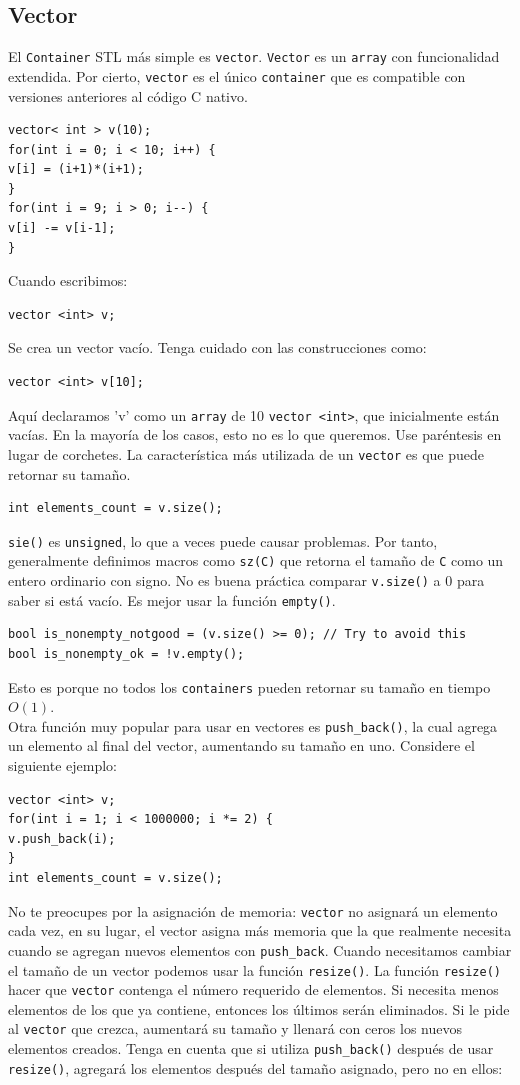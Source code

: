 \documentclass[a4paper,12pt]{article}
\begin{document}
\subsection*{Vector}
El \texttt{Container} STL más simple es \texttt{vector}. \texttt{Vector} es un \texttt{array} con funcionalidad extendida. Por cierto, \texttt{vector} es el único \texttt{container} que es compatible con versiones anteriores al código C nativo.
\begin{lstlisting}
vector< int > v(10);
for(int i = 0; i < 10; i++) {
v[i] = (i+1)*(i+1);
}
for(int i = 9; i > 0; i--) {
v[i] -= v[i-1];
}
\end{lstlisting}
Cuando escribimos:
\begin{lstlisting}
vector <int> v;
\end{lstlisting}
Se crea un vector vacío. Tenga cuidado con las construcciones como:
\begin{lstlisting}
vector <int> v[10];
\end{lstlisting}
Aquí declaramos 'v' como un \texttt{array} de 10 \texttt{vector <int>}, que inicialmente están vacías. En la mayoría de los casos, esto no es lo que queremos. Use paréntesis en lugar de corchetes. La característica más utilizada de un \texttt{vector} es que puede retornar su tamaño.
\begin{lstlisting}
int elements_count = v.size();
\end{lstlisting}
\texttt{sie()} es \texttt{unsigned}, lo que a veces puede causar problemas. Por tanto, generalmente definimos macros como \texttt{sz(C)} que retorna el tamaño de \texttt{C} como un entero ordinario con signo. No es buena práctica comparar \texttt{v.size()} a 0 para saber si está vacío. Es mejor usar la función \texttt{empty()}.
\begin{lstlisting}
bool is_nonempty_notgood = (v.size() >= 0); // Try to avoid this
bool is_nonempty_ok = !v.empty();
\end{lstlisting}
Esto es porque no todos los \texttt{containers} pueden retornar su tamaño en tiempo $O(1)$.\\
Otra función muy popular para usar en vectores es \texttt{push\_back()}, la cual agrega un elemento al final del vector, aumentando su tamaño en uno. Considere el siguiente ejemplo:
\begin{lstlisting}
vector <int> v;
for(int i = 1; i < 1000000; i *= 2) {
v.push_back(i);
}
int elements_count = v.size();
\end{lstlisting}
No te preocupes por la asignación de memoria: \texttt{vector} no asignará un elemento cada vez, en su lugar, el vector asigna más memoria que la que realmente necesita cuando se agregan nuevos elementos con \texttt{push\_back}. Cuando necesitamos cambiar el tamaño de un vector podemos usar la función \texttt{resize()}. La función \texttt{resize()} hacer que \texttt{vector} contenga el número requerido de elementos. Si necesita menos elementos de los que ya contiene, entonces los últimos serán eliminados. Si le pide al \texttt{vector} que crezca, aumentará su tamaño y llenará con ceros los nuevos elementos creados. Tenga en cuenta que si utiliza \texttt{push\_back()} después de usar \texttt{resize()}, agregará los elementos después del tamaño asignado, pero no en ellos:
\end{document}
